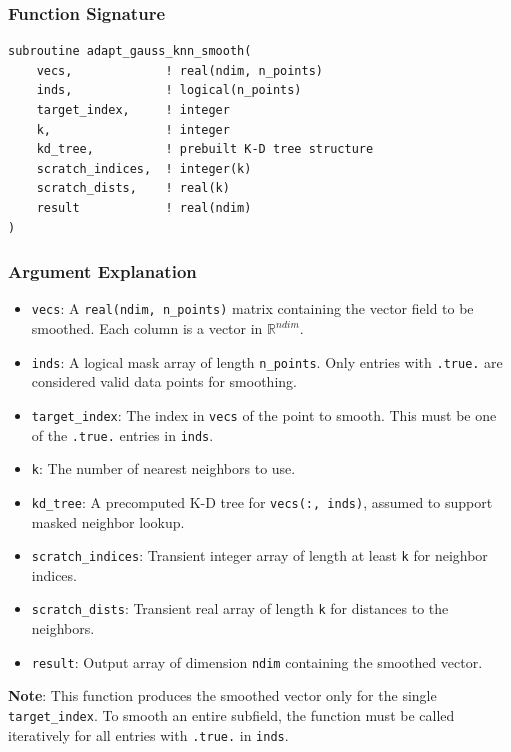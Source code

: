 \documentclass{article}
\begin{document}
\subsubsection*{Function Signature}

\begin{verbatim}
subroutine adapt_gauss_knn_smooth(
    vecs,             ! real(ndim, n_points)
    inds,             ! logical(n_points)
    target_index,     ! integer
    k,                ! integer
    kd_tree,          ! prebuilt K-D tree structure
    scratch_indices,  ! integer(k)
    scratch_dists,    ! real(k)
    result            ! real(ndim)
)
\end{verbatim}

\subsubsection*{Argument Explanation}

\begin{itemize}
  \item \texttt{vecs}: A \texttt{real(ndim, n\_points)} matrix containing the vector field to be smoothed. Each column is a vector in $\mathbb{R}^{ndim}$.
  \item \texttt{inds}: A logical mask array of length \texttt{n\_points}. Only entries with \texttt{.true.} are considered valid data points for smoothing.
  \item \texttt{target\_index}: The index in \texttt{vecs} of the point to smooth. This must be one of the \texttt{.true.} entries in \texttt{inds}.
  \item \texttt{k}: The number of nearest neighbors to use.
  \item \texttt{kd\_tree}: A precomputed K-D tree for \texttt{vecs(:, inds)}, assumed to support masked neighbor lookup.
  \item \texttt{scratch\_indices}: Transient integer array of length at least \texttt{k} for neighbor indices.
  \item \texttt{scratch\_dists}: Transient real array of length \texttt{k} for distances to the neighbors.
  \item \texttt{result}: Output array of dimension \texttt{ndim} containing the smoothed vector.
\end{itemize}

\textbf{Note}: This function produces the smoothed vector only for the single \texttt{target\_index}. To smooth an entire subfield, the function must be called iteratively for all entries with \texttt{.true.} in \texttt{inds}.
\end{document}
